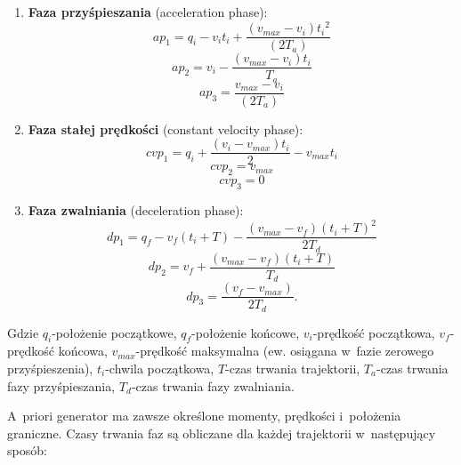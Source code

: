 \documentclass[a4paper, 12pt]{article}
\begin{document}
	\begin{enumerate}
	\item \textbf{Faza przyśpieszania} (acceleration phase):
		\begin{equation}
		\label{eq:ap1}
		ap_1 = q_i - v_it_i + \frac{(v_{max}-v_i){t_i}^2}{(2T_a)}
		\end{equation}
		\begin{equation}
		\label{eq:ap2}
		ap_2 = v_i - \frac{(v_{max}-v_i)t_i}{T_a}
		\end{equation}
		\begin{equation}
		\label{eq:ap3}
		ap_3 = \frac{v_{max}-v_i}{(2T_a)}
		\end{equation}

	\item \textbf{Faza stałej prędkości} (constant velocity phase):
		\begin{equation}
		\label{eq:cvp1}
		cvp_1 = q_i + \frac{(v_i-v_{max})t_i}{2}- v_{max}t_i
		\end{equation}
		\begin{equation}
		\label{eq:cvp2}
		cvp_2 = v_{max}
		\end{equation}
		\begin{equation}
		\label{eq:cvp3}
		cvp_3 = 0
		\end{equation}
	\item \textbf{Faza zwalniania} (deceleration phase):
		\begin{equation}
		\label{eq:dp1}
		dp_1 = q_f - v_f(t_i+T) - \frac{(v_{max}-v_f)(t_i+T)^2}{2T_d}
		\end{equation}
		\begin{equation}
		\label{eq:dp2}
		dp_2 = v_f + \frac{(v_{max}-v_f)(t_i+T)}{T_d}
		\end{equation}
		\begin{equation}
		\label{eq:dp3}
		dp_3 = \frac{(v_f-v_{max})}{2T_d}.
		\end{equation}
	\end{enumerate}
	{\footnotesize Gdzie $ q_i $-położenie początkowe, $ q_f $-położenie końcowe, $ v_i $-prędkość początkowa, $ v_f $-prędkość końcowa, $ v_{max} $-prędkość maksymalna (ew. osiągana w~fazie zerowego przyśpieszenia), $ t_i $-chwila początkowa, $ T $-czas trwania trajektorii, $ T_a $-czas trwania fazy przyśpieszania, $ T_d $-czas trwania fazy zwalniania.}
	\vspace{10px}
	\par A~priori generator ma zawsze określone momenty, prędkości i~położenia graniczne. Czasy trwania faz są obliczane dla każdej trajektorii w~następujący sposób:
\end{document}

